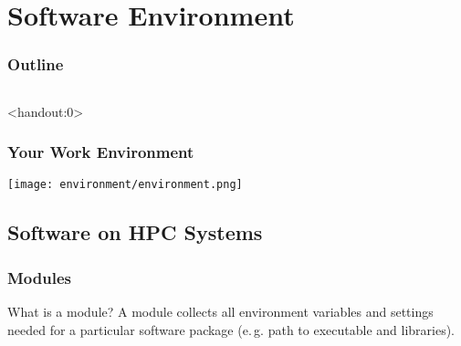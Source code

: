 \section{Software Environment}

\begin{frame}
    \frametitle{Outline}
    \begin{columns}[t]
        \begin{column}{.5\textwidth}
            \tableofcontents[sections={1-9},currentsection]
        \end{column}
        \begin{column}{.5\textwidth}
            \tableofcontents[sections={10-18},currentsection]
        \end{column}
    \end{columns}
\end{frame}

\begin{frame}<handout:0> 
  \frametitle{Your Work Environment}
  \centering
  \texttt{[image: environment/environment.png]}
\end{frame}

\subsection{Software on HPC Systems}

\begin{frame}[fragile]
  \frametitle{Modules}
  \vspace{-1.3em}
  \begin{block}{What is a module?}
    A module collects all environment variables and settings needed for a particular software package (e.\,g. path to executable and libraries).
  \end{block}
  \vspace{-0.8em}
  
  \vfill
\end{frame}


